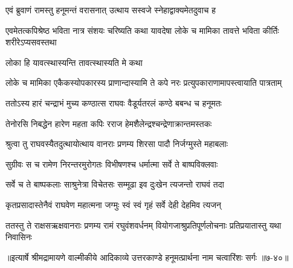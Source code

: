 \twolineshloka
{एवं ब्रुवाणं रामस्तु हनूमन्तं वरासनात्}
{उत्थाय सस्वजे स्नेहाद्वाक्यमेतदुवाच ह} %

\threelineshloka
{एवमेतत्कपिश्रेष्ठ भविता नात्र संशयः}
{चरिष्यति कथा यावदेषा लोके च मामिका}
{तावत्ते भविता कीर्तिः शरीरेऽप्यसवस्तथा} %

\onelineshloka
{लोका हि यावत्स्थास्यन्ति तावत्स्थास्यति मे कथा} %

\threelineshloka
{लोके च मामिका}
{एकैकस्योपकारस्य प्राणान्दास्यामि ते कपे}
{नरः प्रत्युपकाराणामापस्त्वायाति पात्रताम्} %

\twolineshloka
{ततोऽस्य हारं चन्द्राभं मुच्य कण्ठात्स राघवः}
{वैडूर्यतरलं कण्ठे बबन्ध च हनूमतः} %

\twolineshloka
{तेनोरसि निबद्धेन हारेण महता कपिः}
{रराज हेमशैलेन्द्रश्चन्द्रेणाक्रान्तमस्तकः} %

\twolineshloka
{श्रुत्वा तु राघवस्यैतदुत्थायोत्थाय वानराः}
{प्रणम्य शिरसा पादौ निर्जग्मुस्ते महाबलाः} %

\twolineshloka
{सुग्रीवः स च रामेण निरन्तरमुरोगतः}
{विभीषणश्च धर्मात्मा सर्वे ते बाष्पविक्लवाः} %

\twolineshloka
{सर्वे च ते बाष्पकलाः साश्रुनेत्रा विचेतसः}
{सम्मूढा इव दुःखेन त्यजन्तो राघवं तदा} %

\twolineshloka
{कृतप्रसादास्तेनैवं राघवेण महात्मना}
{जग्मुः स्वं स्वं गृहं सर्वे देही देहमिव त्यजन्} %

\twolineshloka
{ततस्तु ते राक्षसऋक्षवानराः प्रणम्य रामं रघुवंशवर्धनम्}
{वियोगजाश्रुप्रतिपूर्णलोचनाः प्रतिप्रयातास्तु यथा निवासिनः} %


॥इत्यार्षे श्रीमद्रामायणे वाल्मीकीये आदिकाव्ये उत्तरकाण्डे हनूमत्प्रार्थना नाम चत्वारिंशः सर्गः ॥७-४०॥
